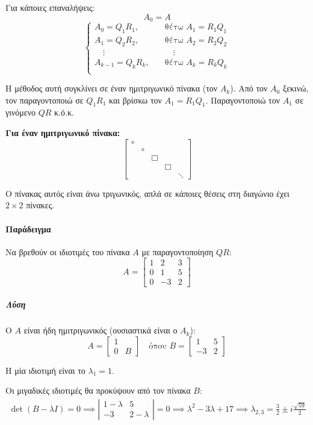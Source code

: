 \documentclass[11pt,a4paper,notitlepage,fleqn]{article}
\begin{document}
Για κάποιες επαναλήψεις:
\[
A_0 = A
\]
\[
\begin{cases}
A_0 = Q_1R_1, &\quad \text{θέτω } A_1 = R_1Q_1 \\
A_1 = Q_2R_2, &\quad \text{θέτω } A_2 = R_2Q_2 \\
\quad \vdots &\quad \quad \vdots \\
A_{k-1} = Q_kR_k, &\quad \text{θέτω } A_k = R_kQ_k \\
\end{cases}
\]

Η μέθοδος αυτή συγκλίνει σε έναν ημιτριγωνικό πίνακα (τον
\( A_k \)). Από τον \( A_0 \) ξεκινώ, τον παραγοντοποιώ σε
\( Q_1R_1 \) και βρίσκω τον \( A_1 = R_1Q_1 \). Παραγοντοποιώ τον
\( A_1 \) σε γινόμενο \( QR \) κ.ό.κ.

\textbf{Για έναν ημιτριγωνικό πίνακα:}
\[ \left[
\begin{matrix}
\circ & & & & \\
& \circ & & & \\
& & \Box & & \\
& & & \Box & \\
& & & & \ddots
\end{matrix} \right]
\]

Ο πίνακας αυτός είναι άνω τριγωνικός, απλά σε κάποιες θέσεις στη
διαγώνιο έχει \( 2\times 2 \) πίνακες.

\paragraph{Παράδειγμα}
Να βρεθούν οι ιδιοτιμές του πίνακα \( A \) με παραγοντοποίηση
\( QR \):
\[
A = \left[\begin{matrix}
1&2&3 \\ 0 & 1 & 5 \\ 0 & -3 & 2
\end{matrix}\right]
\]
\subparagraph{Λύση}
Ο \( A \) είναι ήδη ημιτριγωνικός (ουσιαστικά είναι ο \( A_k \)):
\[
A = \left[\begin{matrix}
1 & \\ 0 & \boxed{B}
\end{matrix}
\right] \quad \text{όπου } B = \left[
\begin{matrix}
1 & 5 \\ -3 & 2
\end{matrix}\right]
\]

Η μία ιδιοτιμή είναι το \( \lambda_1 = 1 \).

Οι μιγαδικές ιδιοτιμές θα προκύψουν από τον πίνακα \( B \):
\begin{align*}
	\det(B-\lambda I) = 0 \implies
	\left|\begin{matrix}
	1-\lambda & 5 \\ -3 & 2-\lambda
	\end{matrix}
	\right| = 0 \implies \lambda^2 -3\lambda + 17
	\implies \lambda_{2,3} =\frac{3}{2} \pm i\frac{\sqrt{59}}{2}
\end{align*}
\end{document}
